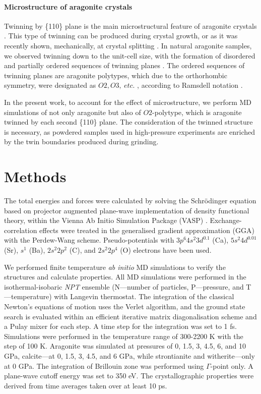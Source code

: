 \documentclass[journal=jacsat,manuscript=article]{achemso}
\begin{document}
	\paragraph{Microstructure of aragonite crystals}
Twinning by \{110\} plane is the main microstructural feature of aragonite crystals \cite{marsh1980, suzuki2012, gavr2019_arag}. 
This type of twinning can be produced during crystal growth, or as it was recently shown, mechanically, at crystal splitting \cite{shin2016}. 
In natural aragonite samples, we observed twinning down to the unit-cell size, with the formation of disordered and partially ordered sequences of twinning planes \cite{gavr2019_arag}. 
The ordered sequences of twinning planes are aragonite polytypes, which due to the orthorhombic symmetry, were designated as $O2, O3,\ etc.$ , according to Ramsdell notation \cite{gavr2019_arag}. 

In the present work, to account for the effect of microstructure, we perform MD simulations of not only aragonite but also of $O2$-polytype, which is aragonite twinned by each second \{110\} plane. 
The consideration of the twinned structure is necessary, as powdered samples used in high-pressure experiments are enriched by the twin boundaries produced during grinding.


			\section{Methods}
The total energies and forces were calculated by solving the Schr{\"o}dinger equation based on projector augmented plane-wave  implementation of density functional theory, within the Vienna Ab Initio Simulation Package (VASP) \cite{kresse1999}.
Exchange-correlation effects were treated in the generalised gradient approximation (GGA) with the Perdew-Wang scheme\cite{perdew1992}. 
Pseudo-potentials with $3p^{6}4s^{2}3d^{0.1}$ (Ca), $5s^{2}4d^{0.01}$ (Sr), $s^{1}$ (Ba), $2s^{2}2p^{2}$ (C), and $2s^{2}2p^{4}$ (O) electrons have been used.

We performed finite temperature {\it ab initio} MD simulations to verify the structures and calculate properties. All MD simulations were performed in the isothermal-isobaric {\it NPT} ensemble (N---number of particles, P---pressure, and T---temperature) with Langevin thermostat. The integration of the classical Newton's equations of motion uses the Verlet algorithm, and the ground state search is evaluated within an efficient iterative matrix diagonalisation scheme and a Pulay mixer for each step. A time step for the integration was set to 1 fs. Simulations were performed in the temperature range of 300-2200 K with the step of 100 K. Aragonite  was simulated at pressures of 0, 1.5, 3, 4.5, 6, and 10 GPa, calcite---at 0, 1.5, 3, 4.5, and 6 GPa, while strontianite and witherite---only at 0 GPa.
The integration of Brillouin zone was performed using $\Gamma$-point only. A plane-wave cutoff energy was set to 350 eV. The crystallographic properties were derived from time averages taken over at least 10 ps.
\end{document}
